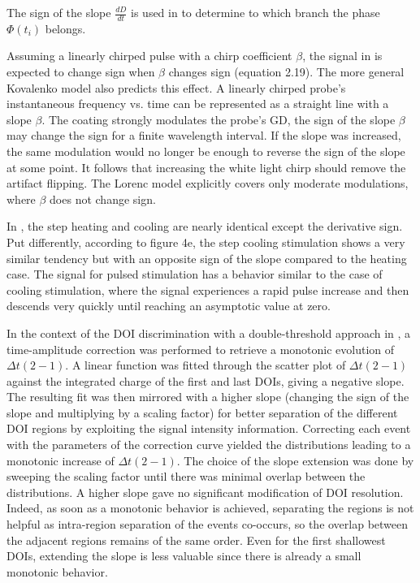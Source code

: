 \documentclass[11pt]{book}
\begin{document}
The sign of the slope $\frac{dD}{dt}$ is used in \cite{wang2016scattering}
to determine to which branch the phase $\Phi\left(t_{i}\right)$ belongs.

Assuming a linearly chirped pulse with a chirp coefficient $\beta$,
the signal in \cite{baudisch2018time} is expected to change sign
when $\beta$ changes sign (equation 2.19). The more general Kovalenko
model also predicts this effect. A linearly chirped probe's instantaneous
frequency vs. time can be represented as a straight line with a slope
$\beta$. The coating strongly modulates the probe's GD, the sign
of the slope $\beta$ may change the sign for a finite wavelength
interval. If the slope was increased, the same modulation would no
longer be enough to reverse the sign of the slope at some point. It
follows that increasing the white light chirp should remove the artifact
flipping. The Lorenc model explicitly covers only moderate modulations,
where $\beta$ does not change sign.

In \cite{venegas2018development}, the step heating and cooling are
nearly identical except the derivative sign. Put differently, according
to figure 4e, the step cooling stimulation shows a very similar tendency
but with an opposite sign of the slope compared to the heating case.
The signal for pulsed stimulation has a behavior similar to the case
of cooling stimulation, where the signal experiences a rapid pulse
increase and then descends very quickly until reaching an asymptotic
value at zero.

In the context of the DOI discrimination with a double-threshold approach
in \cite{polyachenko2020lynden}, a time-amplitude correction was
performed to retrieve a monotonic evolution of $\Delta t\left(2-1\right)$.
A linear function was fitted through the scatter plot of $\Delta t\left(2-1\right)$
against the integrated charge of the first and last DOIs, giving a
negative slope. The resulting fit was then mirrored with a higher
slope (changing the sign of the slope and multiplying by a scaling
factor) for better separation of the different DOI regions by exploiting
the signal intensity information. Correcting each event with the parameters
of the correction curve yielded the distributions leading to a monotonic
increase of $\Delta t\left(2-1\right)$. The choice of the slope extension
was done by sweeping the scaling factor until there was minimal overlap
between the distributions. A higher slope gave no significant modification
of DOI resolution. Indeed, as soon as a monotonic behavior is achieved,
separating the regions is not helpful as intra-region separation of
the events co-occurs, so the overlap between the adjacent regions
remains of the same order. Even for the first shallowest DOIs, extending
the slope is less valuable since there is already a small monotonic
behavior.
\end{document}
